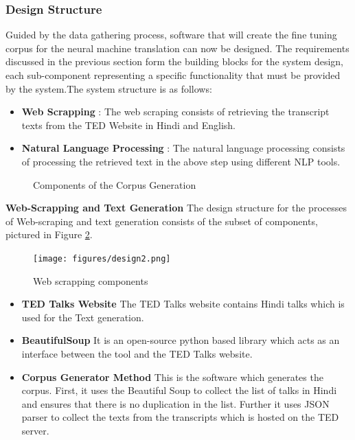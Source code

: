 \subsubsection{Design Structure}

Guided by the data gathering process, software that will create the fine tuning corpus for the neural machine translation can now be designed. The requirements discussed in the previous section form the building blocks for the system design, each sub-component representing a specific functionality that must be provided by the system.The system structure is as follows:

\begin{itemize}
    \item \textbf{Web Scrapping} : The web scraping consists of retrieving the transcript texts from the TED Website in Hindi and English.
    \item \textbf{Natural Language Processing} : The natural language processing consists of processing the retrieved text in the above step using different NLP tools.
\end{itemize}

\begin{figure}[!h]
\caption{Components of the Corpus Generation} \label{design1}
\end{figure}

\textbf{Web-Scrapping and Text Generation}
The design structure for the processes of Web-scraping and text generation consists of the subset of components, pictured in Figure \ref{design2}.

\begin{figure}[h]
\texttt{[image: figures/design2.png]}
\caption{Web scrapping components} \label{design2}
\end{figure}

\begin{itemize}
    \item \textbf{TED Talks Website} The TED Talks website contains Hindi talks which is used for the Text generation.
    \item \textbf{BeautifulSoup} It is an open-source python based library which acts as an interface between the tool and the TED Talks website.
    \item \textbf{Corpus Generator Method} This is the software which generates the corpus. First, it uses the Beautiful Soup to collect the list of talks in Hindi and ensures that there is no duplication in the list. Further it uses JSON parser to collect the texts from the transcripts which is hosted on the TED server.
\end{itemize}

